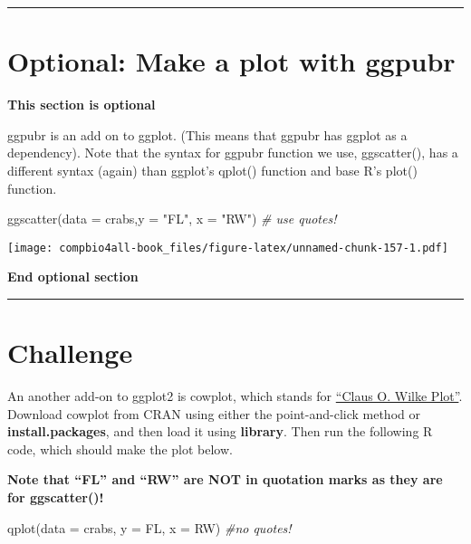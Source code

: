 \documentclass[
]{book}
\newenvironment{Shaded}{\begin{snugshade}}{\end{snugshade}}
\newcommand{\AttributeTok}[1]{\textcolor[rgb]{0.77,0.63,0.00}{#1}}
\newcommand{\CommentTok}[1]{\textcolor[rgb]{0.56,0.35,0.01}{\textit{#1}}}
\newcommand{\FunctionTok}[1]{\textcolor[rgb]{0.00,0.00,0.00}{#1}}
\newcommand{\NormalTok}[1]{#1}
\newcommand{\StringTok}[1]{\textcolor[rgb]{0.31,0.60,0.02}{#1}}
\begin{document}
\begin{center}\rule{0.5\linewidth}{0.5pt}\end{center}

\hypertarget{optional-make-a-plot-with-ggpubr}{%
\section{Optional: Make a plot with ggpubr}\label{optional-make-a-plot-with-ggpubr}}

\textbf{This section is optional}

ggpubr is an add on to ggplot. (This means that ggpubr has ggplot as a dependency). Note that the syntax for ggpubr function we use, ggscatter(), has a different syntax (again) than ggplot's qplot() function and base R's plot() function.

\begin{Shaded}
\begin{Highlighting}[]
\FunctionTok{ggscatter}\NormalTok{(}\AttributeTok{data =}\NormalTok{ crabs,}\AttributeTok{y =} \StringTok{"FL"}\NormalTok{, }\AttributeTok{x =} \StringTok{"RW"}\NormalTok{) }\CommentTok{\# use quotes!}
\end{Highlighting}
\end{Shaded}

\texttt{[image: compbio4all-book\_files/figure-latex/unnamed-chunk-157-1.pdf]}

\textbf{End optional section}

\begin{center}\rule{0.5\linewidth}{0.5pt}\end{center}

\hypertarget{challenge}{%
\section{Challenge}\label{challenge}}

An another add-on to ggplot2 is cowplot, which stands for \href{https://cran.r-project.org/web/packages/cowplot/vignettes/introduction.html}{``Claus O. Wilke Plot''}. Download cowplot from CRAN using either the point-and-click method or \textbf{install.packages}, and then load it using \textbf{library}. Then run the following R code, which should make the plot below.

\textbf{Note that ``FL'' and ``RW'' are NOT in quotation marks as they are for ggscatter()!}

\begin{Shaded}
\begin{Highlighting}[]
\FunctionTok{qplot}\NormalTok{(}\AttributeTok{data =}\NormalTok{ crabs, }\AttributeTok{y =}\NormalTok{ FL, }\AttributeTok{x =}\NormalTok{ RW) }\CommentTok{\#no quotes!}
\end{Highlighting}
\end{Shaded}
\end{document}
